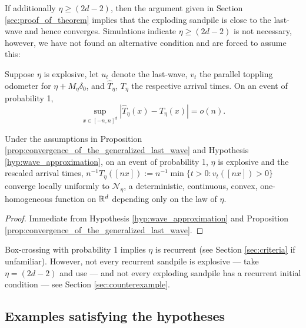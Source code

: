 \documentclass[12pt]{amsart}
\begin{document}
If additionally $\eta \geq (2 d - 2)$, then the argument given in Section \ref{sec:proof_of_theorem} implies that the exploding
sandpile is close to the last-wave and hence converges. Simulations indicate $\eta \geq (2d - 2)$ is not necessary, however, we have not found an alternative condition and are forced to assume this: 

\begin{hyp} \label{hyp:wave_approximation}
	Suppose $\eta$ is explosive, let $u_t$ denote the last-wave, $v_t$ the parallel toppling odometer for $\eta + M_{\eta}  \delta_0$,
	and $\hat{T}_{\eta}$, $T_{\eta}$ the respective arrival times. On an event of probability 1, 
	\[
	\sup_{x \in [-n,n]^d} |\hat{T}_{\eta}(x)- T_{\eta}(x)| = o(n).
	\]
\end{hyp}


\begin{theorem} \label{theorem:generalized_convergence}
	Under the assumptions in Proposition \ref{prop:convergence_of_the_generalized_last_wave} and Hypothesis \ref{hyp:wave_approximation},
	on an event of probability 1, $\eta$ is explosive and the rescaled arrival times, $n^{-1} T_{\eta}([nx]) := n^{-1} \min \{ t > 0 : v_t([nx]) > 0\}$ converge locally uniformly to $\mathcal{N}_{\eta}$, a deterministic, continuous, convex, one-homogeneous function on $\mathbb{R}^d$
	depending only on the law of $\eta$.
\end{theorem}

\begin{proof}
	Immediate from Hypothesis \ref{hyp:wave_approximation} and Proposition \ref{prop:convergence_of_the_generalized_last_wave}.
\end{proof}

\begin{remark} 
	Box-crossing with probability 1 implies $\eta$ is recurrent (see Section \ref{sec:criteria} if unfamiliar).  However, not every 
	recurrent sandpile is explosive  --- take $\eta = (2 d - 2)$ and use \cite{fey2010growth} --- and not every exploding sandpile has a recurrent initial condition ---  see Section \ref{sec:counterexample}. 
\end{remark}



\subsection{Examples satisfying the hypotheses}
\end{document}
